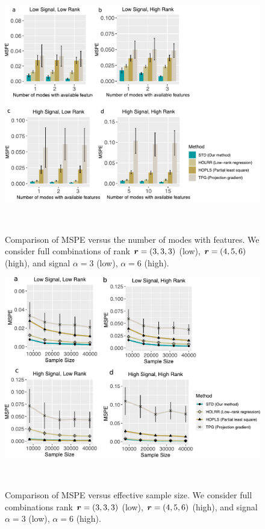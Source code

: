 \documentclass[12pt]{article}
\theoremstyle{definition}
\theoremstyle{definition}
\begin{document}
\begin{figure}[H]
\centering
\includegraphics[width=15cm]{Supp_Figure1.pdf} 
\caption{Comparison of MSPE versus the number of modes with features. We consider full combinations of rank $\bm{r}=(3,3,3)$ (low), $\bm{r}=(4,5,6)$ (high), and signal $\alpha=3$ (low), $\alpha=6$ (high).}~\label{fig:S1}
\end{figure}

\begin{figure}[H]
\centering
\includegraphics[width=15cm]{Supp_Figure2.pdf} 
\caption{Comparison of MSPE versus effective sample size. We consider full combinations rank $\bm{r}=(3,3,3)$ (low), $\bm{r}=(4,5,6)$ (high), and signal $\alpha=3$ (low), $\alpha=6$ (high). }~\label{fig:S2}
\end{figure}

\newpage


\end{document}
